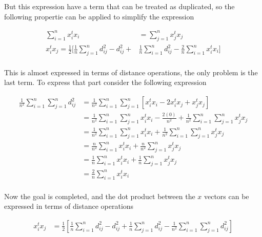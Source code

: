 \documentclass[12pt,journal]{IEEEtran}
\begin{document}
    But this expression have a term that can be treated as duplicated, so the
    following propertie can be applied to simplify the expression

    \begin{equation*}
        \begin{aligned}
            \sum_{i=1}^n x_i^t x_i &= \sum_{j=1}^n x_j^t x_j\\
            x_i^t x_j =
            \frac{1}{2} \Bigg [ \frac{1}{n} \sum_{j=1}^n d_{ij}^2 - d_{ij}^2 + &\frac{1}{n} \sum_{i=1}^n d_{ij}^2 - \frac{2}{n} \sum_{i=1}^n x_i^t x_i \Bigg ]\\
        \end{aligned}
    \end{equation*}

    This is almost expressed in terms of distance operations, the only problem
    is the last term. To express that part consider the following expression

    \begin{equation*}
        \begin{aligned}
            \frac{1}{n^2}\sum_{i=1}^n \sum_{j=1}^n d_{ij}^2
            &=
            \frac{1}{n^2}\sum_{i=1}^n \sum_{j=1}^n [x_i^t x_i - 2 x_i^t x_j + x_j^t x_j]\\
            &=
            \frac{1}{n^2}\sum_{i=1}^n \sum_{j=1}^n x_i^t x_i - \frac{2(0)}{n^2} +  \frac{1}{n^2}\sum_{i=1}^n \sum_{j=1}^nx_j^t x_j\\
            &=
            \frac{1}{n^2}\sum_{i=1}^n \sum_{j=1}^n x_i^t x_i +  \frac{1}{n^2}\sum_{i=1}^n \sum_{j=1}^nx_j^t x_j\\
            &=
            \frac{n}{n^2}\sum_{i=1}^n x_i^t x_i +  \frac{n}{n^2}\sum_{j=1}^n x_j^t x_j\\
            &=
            \frac{1}{n}\sum_{i=1}^n x_i^t x_i +  \frac{1}{n}\sum_{j=1}^n x_j^t x_j\\
            &=
            \frac{2}{n}\sum_{i=1}^n x_i^t x_i\\
        \end{aligned}
    \end{equation*}

    Now the goal is completed, and the dot product between the $x$ vectors
    can be expressed in terms of distance operations

    \begin{equation*}
        \begin{aligned}
            x_i^t x_j
            &=
            \frac{1}{2} \left[ \frac{1}{n} \sum_{i=1}^n d_{ij}^2 - d_{ij}^2 + \frac{1}{n} \sum_{j=1}^n d_{ij}^2 - \frac{1}{n^2}\sum_{i=1}^n \sum_{j=1}^n d_{ij}^2 \right]\\
        \end{aligned}
    \end{equation*}
\end{document}

